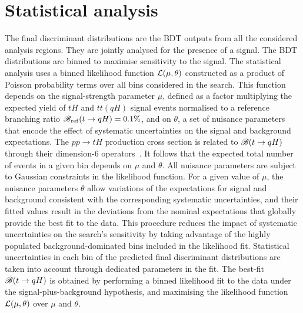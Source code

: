 \section{Statistical analysis}
\label{sec:stat_analysis}


The final discriminant distributions are the BDT outputs from all the considered analysis regions. They are jointly analysed for the 
presence of a signal. The BDT distributions are binned to maximise sensitivity to the signal.
The statistical analysis uses a binned likelihood function ${\cal L}(\mu,\theta)$ constructed as
a product of Poisson probability terms over all bins considered in the search. This function depends
on the signal-strength parameter $\mu$, defined as a factor multiplying the expected yield of $tH$ and $tt(qH)$ signal events
normalised to a reference branching ratio $\mathscr{B}_{\mathrm{ref}}(t\to qH)=0.1\%$,
and on $\theta$, a set of nuisance parameters that encode the effect of systematic uncertainties on the signal and background expectations.
The $pp\rightarrow tH$ production cross section is related to $\mathscr{B}(t\rightarrow qH)$ through their dimension-6 operators~\cite{fcnc_production_theory}.
It follows that the expected total number of events in a given bin depends on $\mu$ and $\theta$. 
All nuisance parameters are subject to Gaussian constraints in the likelihood function.
For a given value of $\mu$, the nuisance parameters $\theta$ allow variations of the expectations for signal and background
consistent with the corresponding systematic uncertainties, and their fitted values result in the deviations from
the nominal expectations that globally provide the best fit to the data.
This procedure reduces the impact of systematic uncertainties on 
the search's sensitivity by taking advantage of the highly populated background-dominated bins included in the likelihood fit.
Statistical uncertainties in each bin of the predicted final discriminant distributions are taken into account through dedicated parameters in the fit.     
The best-fit $\mathscr{B}(t\to qH)$ is obtained by performing a binned likelihood fit to the data under the signal-plus-background
hypothesis, and maximising the likelihood function ${\cal L}(\mu,\theta)$ over $\mu$ and $\theta$.

